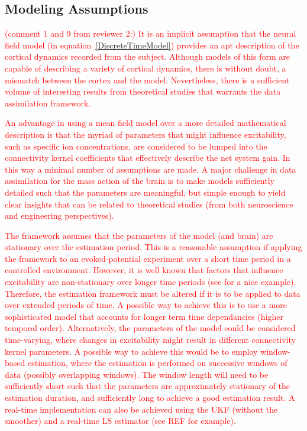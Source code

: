 \documentclass[review,authoryear,3p]{elsarticle}
\newcommand{\dean}[1]{\textcolor{red}{#1}}
\begin{document}
\subsection{Modeling Assumptions}
\dean{(comment 1 and 9 from reviewer 2:) It is an implicit assumption that the neural field model (in equation~\ref{DiscreteTimeModel}) provides an apt description of the cortical dynamics recorded from the subject. Although models of this form are capable of describing a variety of cortical dynamics, there is without doubt, a mismatch between the cortex and the model. Nevertheless, there is a sufficient volume of interesting results from theoretical studies that warrants the data assimilation framework. }

\dean{An advantage in using a mean field model over a more detailed mathematical description is that the myriad of parameters that might influence excitability, such as specific ion concentrations, are considered to be lumped into the connectivity kernel coefficients that effectively describe the net system gain. In this way a minimal number of assumptions are made. A major challenge in data assimilation for the mass action of the brain is to make models sufficiently detailed such that the parameters are meaningful, but simple enough to yield clear insights that can be related to theoretical studies (from both neuroscience and engineering perspectives).}

\dean{The framework assumes that the parameters of the model (and brain) are stationary over the estimation period. This is a reasonable assumption if applying the framework to an evoked-potential experiment over a short time period in a controlled environment. However, it is well known that factors that influence excitability are non-stationary over longer time periods (see \citet{Ullah2010} for a nice example). Therefore, the estimation framework must be altered if it is to be applied to data over extended periods of time. A possible way to achieve this is to use a more sophisticated model that accounts for longer term time dependancies (higher temporal order). Alternatively, the parameters of the model could be considered time-varying, where changes in excitability might result in different connectivity kernel parameters. A possible way to achieve this would be to employ window-based estimation, where the estimation is performed on successive windows of data (possibly overlapping windows). The window length will need to be sufficiently short such that the parameters are approximately stationary of the estimation duration, and sufficiently long to achieve a good estimation result. A real-time implementation can also be achieved using the UKF (without the smoother) and a real-time LS estimator (see REF for example). }
\end{document}
